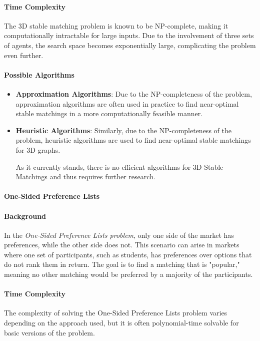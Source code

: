 \paragraph{Time Complexity}
The 3D stable matching problem is known to be NP-complete, making it computationally intractable for large inputs. Due to the involvement of three sets of agents, the search space becomes exponentially large, complicating the problem even further. \cite{survey}

\paragraph{Possible Algorithms}
\begin{itemize}
    \item \textbf{Approximation Algorithms}: Due to the NP-completeness of the problem, approximation algorithms are often used in practice to find near-optimal stable matchings in a more computationally feasible manner. \cite{gusfield}
    \item \textbf{Heuristic Algorithms}: Similarly, due to the NP-completeness of the problem, heuristic algorithms are used to find near-optimal stable matchings for 3D graphs. 
    \cite{3dstable}

    As it currently stands, there is no efficient algorithms for 3D Stable Matchings and thus requires further research.
\end{itemize}

\paragraph{One-Sided Preference Lists}

\paragraph{Background}
In the \emph{One-Sided Preference Lists problem}, only one side of the market has preferences, while the other side does not. This scenario can arise in markets where one set of participants, such as students, has preferences over options that do not rank them in return. The goal is to find a matching that is "popular," meaning no other matching would be preferred by a majority of the participants. \cite{survey}

\paragraph{Time Complexity}
The complexity of solving the One-Sided Preference Lists problem varies depending on the approach used, but it is often polynomial-time solvable for basic versions of the problem. \cite{gusfield}

